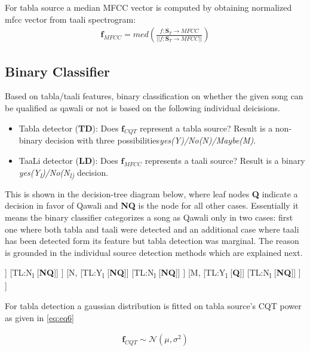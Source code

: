 \documentclass{article}
\begin{document}
For tabla source a median MFCC vector is computed by obtaining normalized mfcc vector from taali spectrogram:
\begin{align}\label{eq:eq7}
\boldsymbol{f}_{MFCC} = med(\frac{f\colon \boldsymbol{S}_{T}\to MFCC}{\lvert \lvert {f\colon \boldsymbol{S}_{T}\to MFCC} \rvert \rvert})
\end{align}

\subsection{Binary Classifier}
Based on tabla/taali features, binary classification on whether the given song can be qualified as qawali or not is based on the following individual deicisions.
\begin{itemize}
	\item Tabla detector (\textbf{TD}): Does $\boldsymbol{f}_{CQT}$ represent a tabla source? Result is a non-binary decision with three possibilities\textit{yes(Y)/No(N)/Maybe(M)}.
	\item TaaLi detector (\textbf{LD}): Does $\boldsymbol{f}_{MFCC}$ represents a taali source? Result is a binary \textit{yes(Y\textsubscript{l})/No(N\textsubscript{l)}} decision.
\end{itemize}
This is shown in the decision-tree diagram below, where leaf nodes \textbf{Q} indicate a decision in favor of Qawali and \textbf{NQ} is the node for all other cases. Essentially it means the binary classifier categorizes a song as Qawali only in two cases: first one where both tabla and taali were detected and an additional case where taali has been detected form its feature but tabla detection was marginal. The reason is grounded in the individual source detection methods which are explained next.

\begin{forest}
[TD,
	[Y,
		[TL:Y\textsubscript{l}
			[\textbf{Q}]]
		[TL:N\textsubscript{l}
			[\textbf{NQ}]]
	]
	[N,
		[TL:Y\textsubscript{l}
			[\textbf{NQ}]]
		[TL:N\textsubscript{l}
			[\textbf{NQ}]]
	]
	[M,
		[TL:Y\textsubscript{l}
			[\textbf{Q}]]
		[TL:N\textsubscript{l}
			[\textbf{NQ}]]
	]
]
\end{forest}

For tabla detection a gaussian distribution is fitted on tabla source's CQT power as given in \ref{eq:eq6}

\begin{align}\label{eq:eq8}
\boldsymbol{f}_{CQT} \sim \mathcal{N}(\mu, \sigma^{2})
\end{align}
\end{document}
